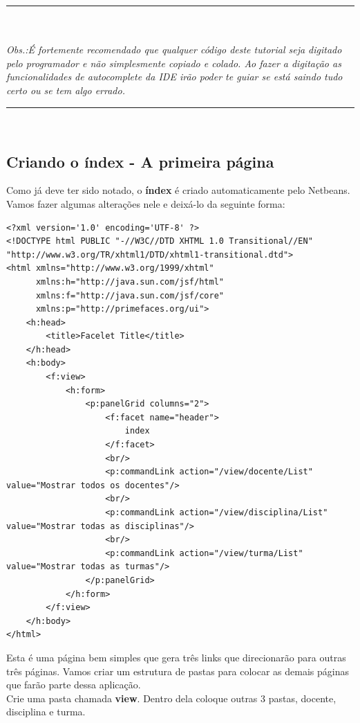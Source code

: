 \documentclass[12pt,a4paper]{article}
\begin{document}
\hrule
\hrulefill\\\\
\textit{Obs.:É fortemente recomendado que qualquer código deste tutorial seja digitado pelo programador e não simplesmente copiado e colado. Ao fazer a digitação as funcionalidades de autocomplete da IDE irão poder te guiar se está saindo tudo certo ou se tem algo errado.}\\
\hrule
\hrulefill\\


\subsection{Criando o índex - A primeira página}

Como já deve ter sido notado, o \textbf{índex} é criado automaticamente pelo Netbeans. Vamos fazer algumas alterações nele e deixá-lo da seguinte forma:

\lstset{language=HTML}
\begin{lstlisting}
<?xml version='1.0' encoding='UTF-8' ?>
<!DOCTYPE html PUBLIC "-//W3C//DTD XHTML 1.0 Transitional//EN" "http://www.w3.org/TR/xhtml1/DTD/xhtml1-transitional.dtd">
<html xmlns="http://www.w3.org/1999/xhtml"
      xmlns:h="http://java.sun.com/jsf/html"
      xmlns:f="http://java.sun.com/jsf/core"
      xmlns:p="http://primefaces.org/ui">
    <h:head>
        <title>Facelet Title</title>
    </h:head>
    <h:body>
        <f:view>
            <h:form>
                <p:panelGrid columns="2">
                    <f:facet name="header">
                        index
                    </f:facet>
                    <br/>
                    <p:commandLink action="/view/docente/List" value="Mostrar todos os docentes"/>
                    <br/>
                    <p:commandLink action="/view/disciplina/List" value="Mostrar todas as disciplinas"/>
                    <br/>
                    <p:commandLink action="/view/turma/List" value="Mostrar todas as turmas"/>                 
                </p:panelGrid>              
            </h:form>
        </f:view>
    </h:body>
</html>
\end{lstlisting}

Esta é uma página bem simples que gera três links que direcionarão para outras três páginas. Vamos criar um estrutura de pastas para colocar as demais páginas que farão parte dessa aplicação.\\
Crie uma pasta chamada \textbf{view}. Dentro dela coloque outras 3 pastas, docente, disciplina e turma. 
\end{document}
